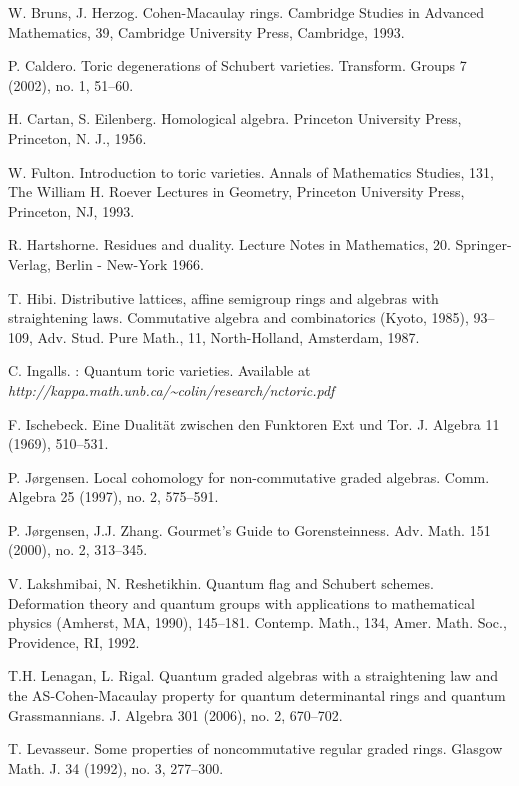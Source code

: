 \documentclass[twoside,11pt]{article}
\begin{document}
\noindent
[BH]
W. Bruns, J. Herzog. Cohen-Macaulay rings.
Cambridge Studies in Advanced Mathematics, 39,
Cambridge University Press,
Cambridge, 1993.

\noindent
[Cal] P. Caldero.
Toric degenerations of Schubert varieties. 
Transform. Groups 7 (2002), no. 1, 51--60. 

\noindent
[CE] H. Cartan, S. Eilenberg. 
Homological algebra. 
Princeton University Press, Princeton, N. J., 1956.

\noindent
[F] W. Fulton.
Introduction to toric varieties. Annals of Mathematics Studies,
131, The William H. Roever Lectures in Geometry,
Princeton University Press, Princeton, NJ, 1993.

\noindent
[Hart] 
R. Hartshorne. 
Residues and duality. 
Lecture Notes in Mathematics, 20. Springer-Verlag, Berlin - New-York 1966.

\noindent
[H] T. Hibi. 
Distributive lattices, affine semigroup rings and algebras with straightening laws.  
Commutative algebra and combinatorics (Kyoto, 1985),  93--109, 
Adv. Stud. Pure Math., 11, North-Holland, Amsterdam, 1987.

\noindent
[Ing] C. Ingalls. : Quantum toric varieties. Available at \\
\noindent
\emph{http://kappa.math.unb.ca/\~{}colin/research/nctoric.pdf}

\noindent
[Isch]
F. Ischebeck.
Eine Dualit\"{a}t zwischen den Funktoren Ext und Tor.  
J. Algebra 11 (1969), 510--531. 

\noindent
[Jor] P. J\o rgensen. 
Local cohomology for non-commutative graded algebras. 
Comm. Algebra 25 (1997), no. 2, 575--591. 

\noindent
[JZ] P. J\o rgensen, J.J. Zhang.
Gourmet's Guide to Gorensteinness.
Adv. Math. 151 (2000), no. 2, 313--345. 

\noindent
[LR] 
V. Lakshmibai, N. Reshetikhin.
Quantum flag and Schubert schemes. 
Deformation theory and quantum groups
with applications to mathematical physics (Amherst, MA, 1990), 145--181.
Contemp. Math., 134, Amer. Math. Soc., Providence, RI, 1992. 

\noindent
[LR1] T.H. Lenagan, L. Rigal. 
Quantum graded algebras with a straightening law and the AS-Cohen-Macaulay property for
quantum determinantal rings and quantum Grassmannians. 
J. Algebra 301 (2006), no. 2, 670--702.

\noindent
[Lev] T. Levasseur.
Some properties of noncommutative regular graded rings. 
Glasgow Math. J. 34 (1992), no. 3, 277--300.
\end{document}
